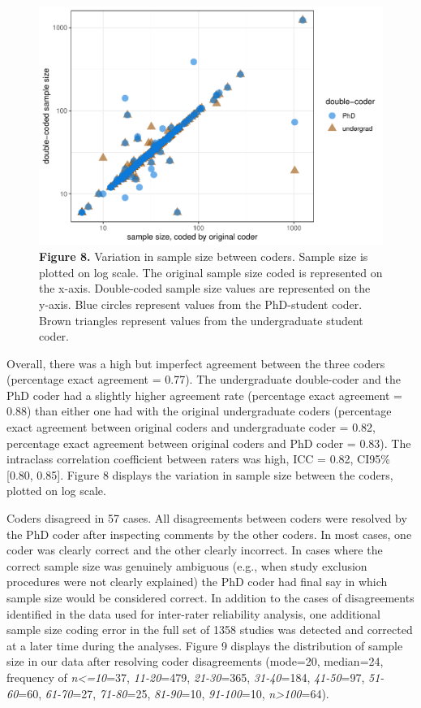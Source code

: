 \documentclass[
  english,
  man,floatsintext]{apa6}
\begin{document}
\begin{figure}
\centering
\includegraphics{RVcn_feasibility_in_social_neuroscience_files/figure-latex/fig8-1.pdf}
\caption{\label{fig:fig8}\textbf{Figure 8.} Variation in sample size between coders. Sample size is plotted on log scale. The original sample size coded is represented on the x-axis. Double-coded sample size values are represented on the y-axis. Blue circles represent values from the PhD-student coder. Brown triangles represent values from the undergraduate student coder.}
\end{figure}

Overall, there was a high but imperfect agreement between the three coders (percentage exact agreement = 0.77). The undergraduate double-coder and the PhD coder had a slightly higher agreement rate (percentage exact agreement = 0.88) than either one had with the original undergraduate coders (percentage exact agreement between original coders and undergraduate coder = 0.82, percentage exact agreement between original coders and PhD coder = 0.83). The intraclass correlation coefficient between raters was high, ICC = 0.82, CI95\%{[}0.80, 0.85{]}. Figure 8 displays the variation in sample size between the coders, plotted on log scale.

Coders disagreed in 57 cases. All disagreements between coders were resolved by the PhD coder after inspecting comments by the other coders. In most cases, one coder was clearly correct and the other clearly incorrect. In cases where the correct sample size was genuinely ambiguous (e.g., when study exclusion procedures were not clearly explained) the PhD coder had final say in which sample size would be considered correct. In addition to the cases of disagreements identified in the data used for inter-rater reliability analysis, one additional sample size coding error in the full set of 1358 studies was detected and corrected at a later time during the analyses. Figure 9 displays the distribution of sample size in our data after resolving coder disagreements (mode=20, median=24, frequency of \emph{n\textless=10}=37, \emph{11-20}=479, \emph{21-30}=365, \emph{31-40}=184, \emph{41-50}=97, \emph{51-60}=60, \emph{61-70}=27, \emph{71-80}=25, \emph{81-90}=10, \emph{91-100}=10, \emph{n\textgreater100}=64).
\end{document}
